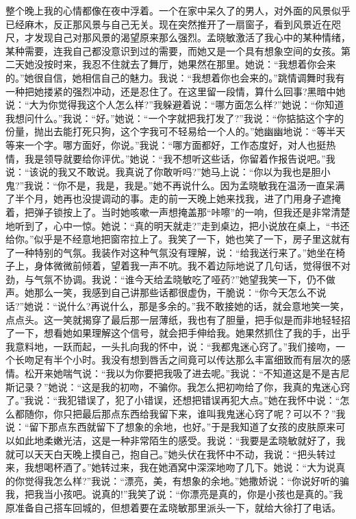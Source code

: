 \documentclass[12pt,oneside]{book}
\begin{document}
整个晚上我的心情都像在夜中浮着。一个在家中呆久了的男人，对外面的风景似乎已经麻木，反正那风景与自己无关。现在突然推开了一扇窗子，看到风景近在咫尺，才发现自己对那风景的渴望原来那么强烈。孟晓敏激活了我心中的某种情绪，某种需要，连我自己都没意识到过的需要，而她又是一个具有想象空间的女孩。第二天她没按时来，我忍不住就去了舞厅，她果然在那里。她说：``我想着你会来的。''她很自信，她相信自己的魅力。我说：``我想着你也会来的。''跳情调舞时我有一种把她搂紧的强烈冲动，还是忍住了。在这里留一段情，算什么回事?黑暗中她说：``大为你觉得我这个人怎么样?''我躲避着说：``哪方面怎么样?''她说：``你知道我想问什么。''我说：``好。''她说：``一个字就把我打发了?''我说：``你掂掂这个字的份量，抛出去能打死只狗，这个字我可不轻易给一个人的。''她幽幽地说：``等半天等来一个字。哪方面好，你说。''我说：``哪方面都好，工作态度好，对人也挺热情，我是领导就要给你评优。''她说：``我不想听这些话，你留着作报告说吧。''我说：``该说的我又不敢说。我真说了你敢听吗?''她马上说：``你以为我也是胆小鬼?''我说：``你不是，我是，我是。''她不再说什么。因为孟晓敏我在温汤一直呆满了半个月，她再也没提调动的事。走的前一天晚上她来找我，进了门用身子遮掩着，把弹子锁按上了。当时她咳嗽一声想掩盖那``咔嚓''的一响，但我还是非常清楚地听到了，心中一惊。她说：``真的明天就走?''走到桌边，把小说放在桌上，``书还给你。''似乎是不经意地把窗帘拉上了。我笑了一下，她也笑了一下，房子里这就有了一种特别的气氛。我装作对这种气氛没有理解，说：``给我送行来了。''她坐在椅子上，身体微微前倾着，望着我一声不吭。我不着边际地说了几句话，觉得很不对劲，与气氛不协调。我说：``谁今天给孟晓敏吃了哑药?''她望我笑一下，仍不做声。她那么一笑，我感到自己讲那些话都很虚伪，干脆说：``你今天怎么不说话?''她说：``说什么?再说什么，那是多余的。''我不敢接她的话，就会意地笑一笑，点点头。这一笑就揭穿了最后那一层薄纸，我也有了胆量，把手似是而非地轻轻招了一下，想看她如果理解这个信号，就会把手伸给我。她果然抓住了我的手，出乎我意料地，一跃而起，一头扎向我的怀中，说：``我都鬼迷心窍了。''我们接吻，一个长吻足有半个小时。我没有想到唇舌之间竟可以传达那么丰富细致而有层次的感情。松开来她喘气说：``我以为你要把我吸了进去呢。''我说：``不知道这是不是吉尼斯记录？''她说：``这是我的初吻，不骗你。我怎么把初吻给了你，我真的鬼迷心窍了。''我说：``我犯错误了，犯了小错误，还想把错误再犯大点。''她在我怀中说：``怎么都随你，你只把最后那点东西给我留下来，谁叫我鬼迷心窍了呢？可以不？''我说：``留下那点东西就留下了想象的余地，也好。''于是我知道了女孩的皮肤原来可以如此地柔嫩光洁，这是一种非常陌生的感受。我说：``我要是孟晓敏就好了，我就可以天天白天晚上摸自己，抱自己。''她头伏在我怀中不动，我说：``把头转过来，我想喝杯酒了。''她转过来，我在她酒窝中深深地吻了几下。她说：``大为说真的你觉得我怎么样?''我说：``漂亮，美，有想象的余地。''她撒娇说：``你说好听的骗我，把我当小孩吧。说真的!''我笑了说：``你漂亮是真的，你是小孩也是真的。''我原准备自己搭车回城的，但想着要在孟晓敏那里派头一下，就给大徐打了电话。
\end{document}
